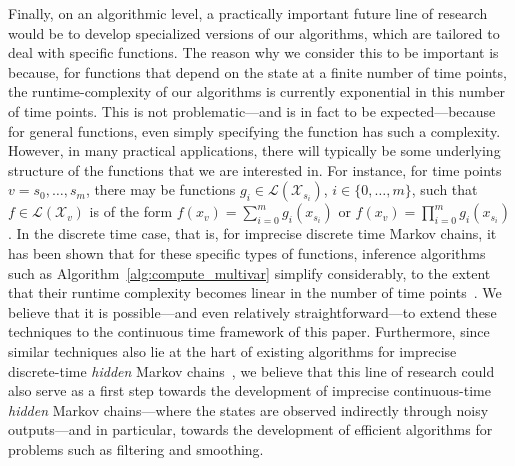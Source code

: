 \documentclass[10pt,a4paper]{paper}
\theoremstyle{definition}
\newcommand{\states}{\mathcal{X}}
\newcommand{\gambles}{\mathcal{L}}
\newcommand{\ictmc}{{ICTMC}}
\begin{document}
Finally, on an algorithmic level, a practically important future line of research would be to develop specialized versions of our algorithms, which are tailored to deal with specific functions. The reason why we consider this to be important is because, for functions that depend on the state at a finite number of time points, the runtime-complexity of our algorithms is currently exponential in this number of time points. This is not problematic---and is in fact to be expected---because for general functions, even simply specifying the function has such a complexity. However, in many practical applications, there will typically be some underlying structure of the functions that we are interested in. For instance, for time points $v=s_0,\ldots,s_m$, there may be functions $g_i\in\gambles(\states_{s_i})$, $i\in\{0,\ldots,m\}$, such that $f\in\gambles(\states_v)$ is of the form $f(x_v) = \sum_{i=0}^m g_i(x_{s_i})$ or $f(x_v) = \prod_{i=0}^m g_i(x_{s_i})$.
In the discrete time case, that is, for imprecise discrete time Markov chains, it has been shown that for these specific types of functions, inference algorithms such as Algorithm~\ref{alg:compute_multivar} simplify considerably, to the extent that their runtime complexity becomes linear in the number of time points~\cite{de2015credal,Lopatatzidis2015}. We believe that it is possible---and even relatively straightforward---to extend these techniques to the continuous time framework of this paper. Furthermore, since similar techniques also lie at the hart of existing algorithms for imprecise discrete-time \emph{hidden} Markov chains~\cite{Benavoli:2011ei,DeBock:2014ts}, we believe that this line of research could also serve as a first step towards the development of imprecise continuous-time \emph{hidden} Markov chains---where the states are observed indirectly through noisy outputs---and in particular, towards the development of efficient algorithms for problems such as filtering and smoothing.
\end{document}
